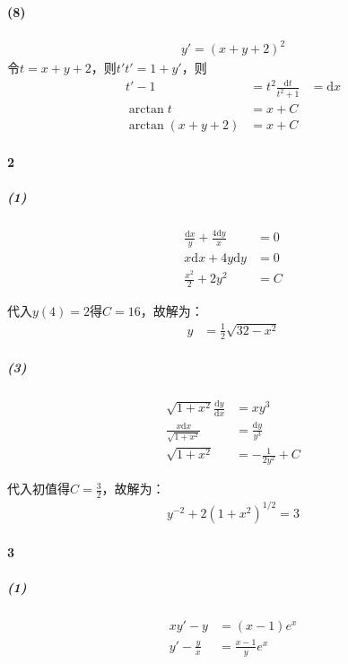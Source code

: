 \documentclass[UTF8]{ctexart}
\begin{document}
    \paragraph*{(8)}
    \begin{align*}
        y' = (x+y+2)^2
    \end{align*}
    令$t=x+y+2$，则$t't'=1+y'$，则
    \begin{align*}
        t'-1 &= t^2
        \frac{\mathrm{d}t}{t^2+1} &= \mathrm{d}x \\ 
        \arctan t &= x + C \\
        \arctan (x+y+2) &= x+C
    \end{align*}
    \paragraph*{2}
    \subparagraph*{(1)}
    \begin{align*}
        \frac{\mathrm{d}x}{y} + \frac{4 \mathrm{d}y}{x} &= 0 \\
        x \mathrm{d}x + 4y \mathrm{d}y &= 0\\
        \frac{x^2}{2} + 2 y^2 &= C
    \end{align*}

    代入$y(4)=2$得$C=16$，故解为：
    \begin{align*}
        y &= \frac{1}{2} \sqrt{32-x^2} 
    \end{align*}
    \subparagraph*{(3)}
    \begin{align*}
        \sqrt{1+x^2} \frac{\mathrm{d}y}{\mathrm{d}x} &= xy^3 \\
        \frac{x \mathrm{d}x}{\sqrt{1+x^2} } &= \frac{\mathrm{d}y}{y^3} \\ 
        \sqrt{1+x^2}  &= -\frac{1}{2y^2} + C
    \end{align*}

    代入初值得$C=\frac{3}{2}$，故解为：
    \begin{align*}
        y^{-2}+2(1+x^2)^{1/2} = 3
    \end{align*}

    \paragraph*{3}
    \subparagraph*{(1)}
    \begin{align*}
        xy' - y &= (x-1)e^x \\
        y' - \frac{y}{x} &= \frac{x-1}{y} e^x
    \end{align*}
\end{document}
